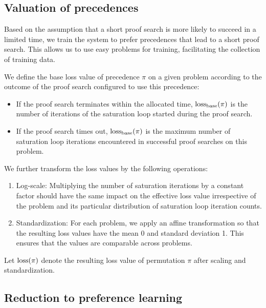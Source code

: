 \subsection{Valuation of precedences}
\label{sec:precedence-valuation}

Based on the assumption that a short proof search is more likely to succeed in a limited time\cite{?},
we train the system to prefer precedences that lead to a short proof search.
This allows us to use easy problems for training, facilitating the collection of training data.

We define the base loss
value of precedence \(\pi\) on a given problem
according to the outcome of the proof search configured to use this precedence:

\begin{itemize}
	\item If the proof search terminates within the allocated time,
	\(\base_loss(\pi)\) is the number of iterations of the saturation loop
	started during the proof search.
	\item If the proof search times out, \(\base_loss(\pi)\) is the maximum number
	of saturation loop iterations encountered in successful proof searches on this problem.
\end{itemize}

We further transform the loss values by the following operations:

\begin{enumerate}
	\item Log-scale: Multiplying the number of saturation iterations by a constant factor
	should have the same impact on the effective loss value
	irrespective of the problem and its particular distribution of saturation loop iteration counts.
	\item Standardization\cite{?}: For each problem,
	we apply an affine transformation so that the resulting loss values
	have the mean 0 and standard deviation 1.
	This ensures that the values are comparable across problems.
\end{enumerate}

Let \(\operatorname{loss}(\pi)\) denote the resulting loss value of permutation \(\pi\)
after scaling and standardization.

\subsection{Reduction to preference learning}

